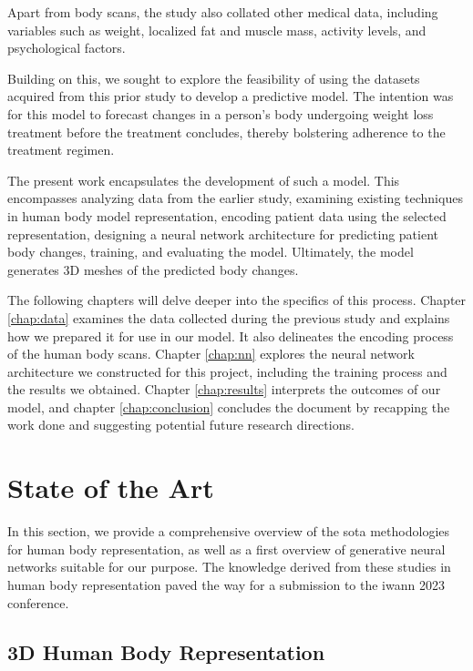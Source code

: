 Apart from body scans, the study also collated other medical data, including
variables such as weight, localized fat and muscle mass, activity levels, and
psychological factors.

Building on this, we sought to explore the feasibility of using the datasets
acquired from this prior study to develop a predictive model. The intention was
for this model to forecast changes in a person's body undergoing weight loss
treatment before the treatment concludes, thereby bolstering adherence to the
treatment regimen.

The present work encapsulates the development of such a model. This encompasses
analyzing data from the earlier study, examining existing techniques in human
body model representation, encoding patient data using the selected
representation, designing a neural network architecture for predicting patient
body changes, training, and evaluating the model. Ultimately, the model
generates 3D meshes of the predicted body changes.

The following chapters will delve deeper into the specifics of this process.
Chapter \ref{chap:data} examines the data collected during the previous study
and explains how we prepared it for use in our model. It also delineates the
encoding process of the human body scans. Chapter \ref{chap:nn} explores the
neural network architecture we constructed for this project, including the
training process and the results we obtained. Chapter \ref{chap:results}
interprets the outcomes of our model, and chapter \ref{chap:conclusion}
concludes the document by recapping the work done and suggesting potential
future research directions.

\section{State of the Art}\label{sec:sota}

In this section, we provide a comprehensive overview of the \gls{sota}
methodologies for human body representation, as well as a first overview of
generative neural networks suitable for our purpose. The knowledge derived from
these studies in human body representation paved the way for a submission to
the \gls{iwann} 2023 conference. 

\subsection{3D Human Body Representation}

